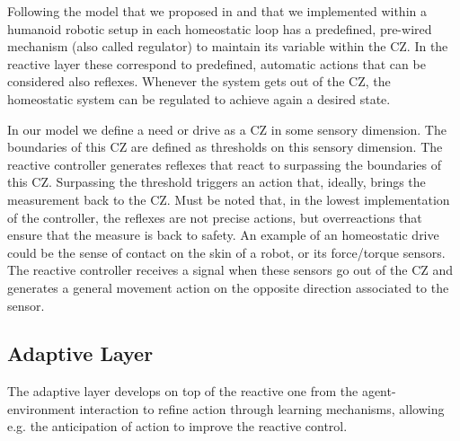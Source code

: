 \documentclass[letterpaper, 10 pt, conference]{ieeeconf}  %
\begin{document}
Following the model that we proposed in \cite{sanchez2010allostatic} and that we implemented within a humanoid robotic setup in \cite{vouloutsi2013modulating} each homeostatic loop has a predefined, pre-wired mechanism (also called regulator) to maintain its variable within the CZ. 
In the reactive layer these correspond to predefined, automatic actions that can be considered also reflexes. Whenever the system gets out of the CZ, the homeostatic system can be regulated to achieve again a desired state. 

In our model we define a need or drive as a CZ in some sensory dimension. The boundaries of this CZ are defined as thresholds on this sensory dimension. The reactive controller generates reflexes that react to surpassing the boundaries of this CZ.  Surpassing the threshold triggers an action that, ideally, brings the measurement back to the CZ. Must be noted that, in the lowest implementation of the controller, the reflexes are not precise actions, but overreactions that ensure that the measure is back to safety. An example of an homeostatic drive could be the sense of contact on the skin of a robot, or its force/torque sensors. The reactive controller receives a signal when these sensors go out of the CZ and generates a general movement action on the opposite direction associated to the sensor. 



\subsection{Adaptive Layer}

The adaptive layer develops on top of the reactive one from the agent-environment interaction to refine action through learning mechanisms, allowing e.g. the anticipation of action to improve the reactive control. 

\end{document}
